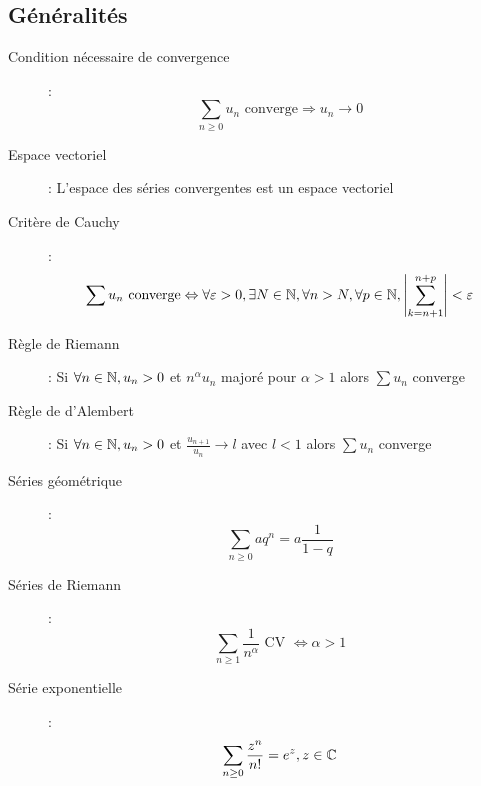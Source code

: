 \subsection{Généralités}
\begin{description}
\item[Condition nécessaire de convergence] : 
    \[ \sum_{n\ge 0}u_n\textrm{ converge}\Rightarrow u_n\longrightarrow 0 \]
\item[Espace vectoriel] : L’espace des séries convergentes est un espace vectoriel
\item[Critère de Cauchy] : 
    \[
    \sum u_n\textrm{ converge}\Leftrightarrow
    \forall\varepsilon>0,\exists N\in\mathbb{N},\forall n>N,
    \forall p\in\mathbb{N},
    \left|\sum_{k=n+1}^{n+p}\right|<\varepsilon
    \]
\item[Règle de Riemann] : Si $\forall n\in\mathbb{N},u_n>0$ et $n^\alpha u_n$ majoré pour $\alpha>1$
    alors $\sum u_n$ converge
\item[Règle de d'Alembert] : Si $\forall n\in\mathbb{N},u_n>0$
    et $\frac{u_{n+1}}{u_n}\longrightarrow l$
    avec $l<1$
    alors $\sum u_n$ converge
\item[Séries géométrique] :
    \[ \sum_{n\ge 0}aq^n=a\frac{1}{1-q} \]
\item[Séries de Riemann] : 
    \[ \sum_{n\ge 1}\frac{1}{n^\alpha}\textrm{ CV }\Leftrightarrow\alpha >1 \]
\item[Série exponentielle] : 
    \[ \sum_{n\ge 0}\frac{z^n}{n!}=e^z, z\in\mathbb{C} \]
\end{description}

